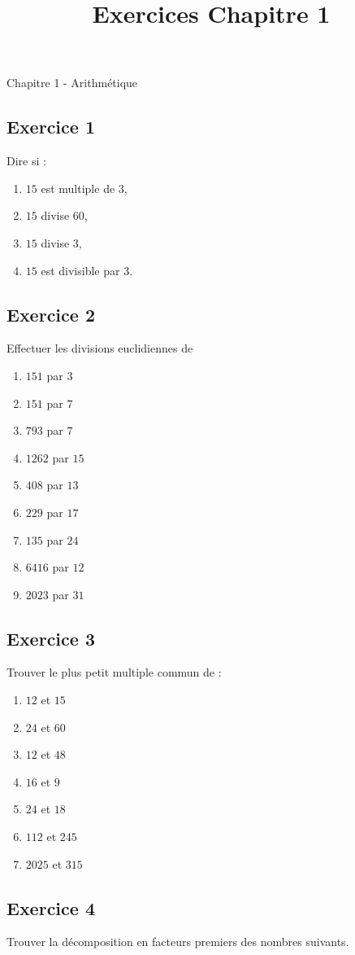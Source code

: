 \documentclass[12 pt]{extarticle}
\title{Exercices Chapitre 1}
\date{}
\theoremstyle{plain}
\begin{document}
\begin{center}{\Large Chapitre 1 - Arithmétique}\\ 
 \end{center}
 
 
 \subsection*{Exercice 1}

Dire si : \begin{enumerate}
\item $15$ est multiple de $3$, 
\item $15$ divise $60$, 
\item $15$ divise $3$, 
\item $15$ est divisible par $3$. 
\end{enumerate}
\subsection*{Exercice 2}
 Effectuer les divisions euclidiennes de 
 \begin{enumerate}
 \item $151$ par $3$
 \item $151$ par $7$
 \item $793$ par $7$
 \item $1262$ par $15$
 \item $408$ par $13$ 
 \item $229$ par $17$
 \item $135$ par $24$
 \item $6416$ par $12$
 \item $2023$ par $31$
 \end{enumerate}
 
 \subsection*{Exercice 3} 
 Trouver le plus petit multiple commun de :
 \begin{enumerate}
 \item $12$ et $15$
 \item $24$ et $60$ 
 \item $12$ et $48$
 \item $16$ et $9$ 
 \item $24$ et $18$
 \item $112$ et $245$
 \item $2025$ et $315$
 \end{enumerate}
 \newpage
\subsection*{Exercice 4}
Trouver la décomposition en facteurs premiers des nombres suivants. 
\end{document}
